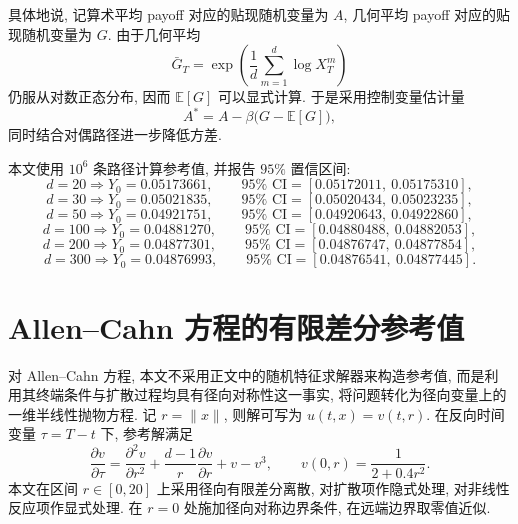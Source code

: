     具体地说, 记算术平均 payoff 对应的贴现随机变量为 $A$,
    几何平均 payoff 对应的贴现随机变量为 $G$.
    由于几何平均
    \begin{equation}
      \bar{G}_T = \exp\!\left(\frac{1}{d}\sum_{m=1}^{d}\log X_T^{m}\right)
    \end{equation}
    仍服从对数正态分布, 因而 $\mathbb{E}[G]$ 可以显式计算.
    于是采用控制变量估计量
    \begin{equation}
      A^{\ast}=A-\beta\bigl(G-\mathbb{E}[G]\bigr),
    \end{equation}
    同时结合对偶路径进一步降低方差.

    本文使用 $10^6$ 条路径计算参考值, 并报告 $95\%$ 置信区间:
    \begin{equation}
      d=20 \Rightarrow Y_0=0.05173661,\qquad
      95\%\text{ CI}=[0.05172011,\ 0.05175310],
    \end{equation}
    \begin{equation}
      d=30 \Rightarrow Y_0=0.05021835,\qquad
      95\%\text{ CI}=[0.05020434,\ 0.05023235],
    \end{equation}
    \begin{equation}
      d=50 \Rightarrow Y_0=0.04921751,\qquad
      95\%\text{ CI}=[0.04920643,\ 0.04922860],
    \end{equation}
    \begin{equation}
      d=100 \Rightarrow Y_0=0.04881270,\qquad
      95\%\text{ CI}=[0.04880488,\ 0.04882053],
    \end{equation}
    \begin{equation}
      d=200 \Rightarrow Y_0=0.04877301,\qquad
      95\%\text{ CI}=[0.04876747,\ 0.04877854],
    \end{equation}
    \begin{equation}
      d=300 \Rightarrow Y_0=0.04876993,\qquad
      95\%\text{ CI}=[0.04876541,\ 0.04877445].
    \end{equation}

  \section{Allen--Cahn 方程的有限差分参考值}\label{sec:ref_allencahn}
    对 Allen--Cahn 方程, 本文不采用正文中的随机特征求解器来构造参考值,
    而是利用其终端条件与扩散过程均具有径向对称性这一事实,
    将问题转化为径向变量上的一维半线性抛物方程.
    记 $r=\lVert x\rVert$, 则解可写为 $u(t,x)=v(t,r)$.
    在反向时间变量 $\tau=T-t$ 下, 参考解满足
    \begin{equation}
      \frac{\partial v}{\partial \tau}
      =
      \frac{\partial^2 v}{\partial r^2}
      + \frac{d-1}{r}\frac{\partial v}{\partial r}
      + v - v^3,
      \qquad
      v(0,r)=\frac{1}{2+0.4r^2}.
    \end{equation}
    本文在区间 $r\in[0,20]$ 上采用径向有限差分离散,
    对扩散项作隐式处理, 对非线性反应项作显式处理.
    在 $r=0$ 处施加径向对称边界条件, 在远端边界取零值近似.

